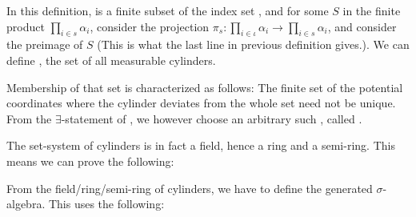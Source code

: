 \documentclass[lean]{AFM}
\begin{document}

\noindent
In this definition,  is a finite subset of the index set
, and for some $S$ in the finite product $\prod_{i \in s}
\alpha_i$, consider the projection $\pi_s : \prod_{i \in \iota}
\alpha_i \to \prod_{i \in s} \alpha_i$, and consider the preimage of
$S$ (This is what the last line in previous definition gives.).
We can define , the set of all measurable cylinders.


\noindent
Membership of that set is characterized as follows:
\noindent
The finite set  of the potential coordinates where
the cylinder deviates from the whole set need not be unique.
From the $\exists$-statement of , we however choose an
arbitrary such , called .


The set-system of cylinders is in fact a field, hence a ring and
a semi-ring. This means we can prove the following:


From the field/ring/semi-ring of cylinders, we have to define the
generated $\sigma$-algebra. This uses the following:
\end{document}
